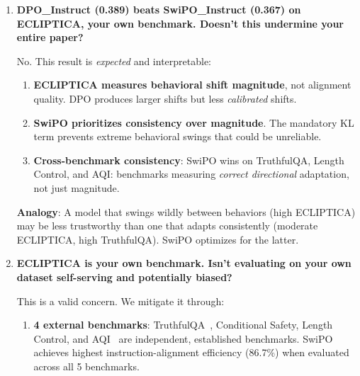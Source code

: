 \begin{enumerate}[label=\textbf{Q\arabic*.}, leftmargin=*, itemsep=8pt]
DPO's wins (ECLIPTICA, Conditional Safety) reflect higher \textit{absolute} scores, but SwiPO achieves more \textit{consistent} improvement across diverse benchmarks. Consistency matters for deployment reliability.

\vspace{4mm}

\item \textbf{DPO\_Instruct (0.389) beats SwiPO\_Instruct (0.367) on ECLIPTICA, your own benchmark. Doesn't this undermine your entire paper?}

 No. This result is \textit{expected} and interpretable:

\begin{enumerate}[leftmargin=*,itemsep=2pt]
    \item \textbf{ECLIPTICA measures behavioral shift magnitude}, not alignment quality. DPO produces larger shifts but less \textit{calibrated} shifts.

    \item \textbf{SwiPO prioritizes consistency over magnitude}. The mandatory KL term prevents extreme behavioral swings that could be unreliable.

    \item \textbf{Cross-benchmark consistency}: SwiPO wins on TruthfulQA, Length Control, and AQI: benchmarks measuring \textit{correct directional} adaptation, not just magnitude.
\end{enumerate}

\textbf{Analogy}: A model that swings wildly between behaviors (high ECLIPTICA) may be less trustworthy than one that adapts consistently (moderate ECLIPTICA, high TruthfulQA). SwiPO optimizes for the latter.

\vspace{4mm}

\item \textbf{ECLIPTICA is your own benchmark. Isn't evaluating on your own dataset self-serving and potentially biased?}

 This is a valid concern. We mitigate it through:

\begin{enumerate}[leftmargin=*,itemsep=2pt]
    \item \textbf{4 external benchmarks}: TruthfulQA~\cite{lin2022truthfulqa}, Conditional Safety, Length Control, and AQI~\cite{hendrycks2023aligning} are independent, established benchmarks. SwiPO achieves highest instruction-alignment efficiency (86.7\%) when evaluated across all 5 benchmarks.


\end{enumerate}
\end{enumerate}
